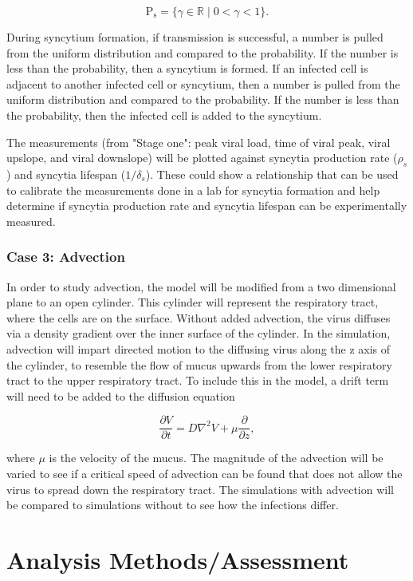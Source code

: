 \documentclass[a4paper]{article}
\begin{document}
$$\mathrm{P_{s}} = \{\gamma \in \mathbb{R} \mid 0<\gamma<1\}.$$

\noindent
During syncytium formation, if transmission is successful, a number is pulled from the uniform distribution and compared to the probability. If the number is less than the probability, then a syncytium is formed. If an infected cell is adjacent to another infected cell or syncytium, then a number is pulled from the uniform distribution and compared to the probability. If the number is less than the probability, then the infected cell is added to the syncytium.

The measurements (from "Stage one": peak viral load, time of viral peak, viral upslope, and viral downslope) will be plotted against syncytia production rate ($\rho _s$) and syncytia lifespan ($1/\delta _s$). These could show a relationship that can be used to calibrate the measurements done in a lab for syncytia formation and help determine if syncytia production rate and syncytia lifespan can be experimentally measured.

\subsubsection{Case 3: Advection}
In order to study advection, the model will be modified from a two dimensional plane to an open cylinder. This cylinder will represent the respiratory tract, where the cells are on the surface. Without added advection, the virus diffuses via a density gradient over the inner surface of the cylinder. In the simulation, advection will impart directed motion to the diffusing virus along the z axis of the cylinder, to resemble the flow of mucus upwards from the lower respiratory tract to the upper respiratory tract. To include this in the model, a drift term will need to be added to the diffusion equation

$$\frac{\partial V}{\partial t} = D\nabla^{2}V + \mu \frac{\partial}{\partial z},$$ 

\noindent
where $\mu$ is the velocity of the mucus. The magnitude of the advection will be varied to see if a critical speed of advection can be found that does not allow the virus to spread down the respiratory tract. The simulations with advection will be compared to simulations without to see how the infections differ.

\section{Analysis Methods/Assessment}
\end{document}
